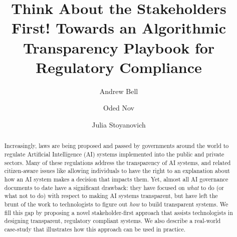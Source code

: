 \documentclass[sigconf, nonacm]{acmart}
\begin{document}
\title{Think About the Stakeholders First! Towards an Algorithmic Transparency Playbook for Regulatory Compliance}

\author{Andrew Bell}

\author{Oded Nov}

\author{Julia Stoyanovich}


\begin{abstract}

Increasingly, laws are being proposed and passed by governments around the world to regulate Artificial Intelligence (AI) systems implemented into the public and private sectors. Many of these regulations address the transparency of AI systems, and related citizen-aware issues like allowing individuals to have the right to an explanation about how an AI system makes a decision that impacts them. Yet, almost all AI governance documents to date have a significant drawback: they have focused on \emph{what} to do (or what not to do) with respect to making AI systems transparent, but have left the brunt of the work to technologists to figure out \emph{how} to build transparent systems. We fill this gap by proposing a novel stakeholder-first approach that assists technologists in designing transparent, regulatory compliant systems. We also describe a real-world case-study that illustrates how this approach can be used in practice.

\end{abstract}
\end{document}

